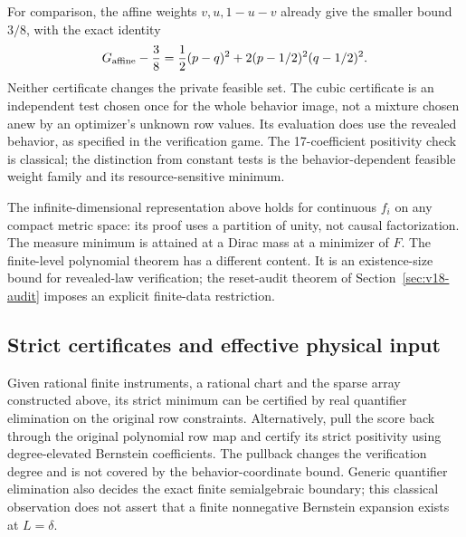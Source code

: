 For comparison, the affine weights $v,u,1-u-v$ already give the
smaller bound $3/8$, with the exact identity
\[
 G_{\rm affine}-\frac38
  =\frac12(p-q)^2+2(p-1/2)^2(q-1/2)^2.
\]
Neither certificate changes the private feasible set. The cubic
certificate is an independent test chosen once for the whole behavior
image, not a mixture chosen anew by an optimizer's unknown row values.
Its evaluation does use the revealed behavior, as specified in the
verification game. The 17-coefficient positivity check is classical;
the distinction from constant tests is the behavior-dependent feasible
weight family and its resource-sensitive minimum.

The infinite-dimensional representation above holds for continuous $f_i$
on any compact metric space: its proof uses a partition of unity, not causal
factorization. The measure minimum is attained at a Dirac mass at a minimizer
of $F$. The finite-level polynomial theorem has a different content. It is
an existence-size bound for revealed-law verification; the reset-audit theorem
of Section~\ref{sec:v18-audit} imposes an explicit finite-data restriction.

\subsection{Strict certificates and effective physical input}
Given rational finite instruments, a rational chart and the sparse
array constructed above, its strict minimum can be certified by real
quantifier elimination on the original row constraints. Alternatively,
pull the score back through the original polynomial row map and
certify its strict positivity using degree-elevated Bernstein
coefficients. The pullback changes the verification degree and is not
covered by the behavior-coordinate bound. Generic quantifier
elimination also decides the exact finite semialgebraic boundary;
this classical observation does not assert that a finite nonnegative
Bernstein expansion exists at $L=\delta$.

